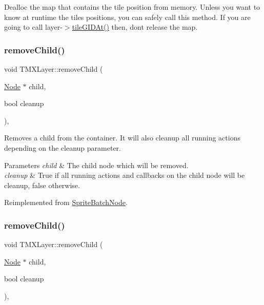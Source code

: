 Dealloc the map that contains the tile position from memory. Unless you want to know at runtime the tiles positions, you can safely call this method. If you are going to call layer-\/$>$\hyperlink{classTMXLayer_a244f8bff6274b630488bf6ebebdeee5a}{tile\+G\+I\+D\+At()} then, don\textquotesingle{}t release the map. \mbox{\label{classTMXLayer_abaf25490e1f7807816c07167a8d4af46}} 
\subsubsection{\texorpdfstring{remove\+Child()}{removeChild()}\hspace{0.1cm}{\footnotesize\ttfamily [1/2]}}
{\footnotesize\ttfamily void T\+M\+X\+Layer\+::remove\+Child (\begin{DoxyParamCaption}\item[{\hyperlink{classNode}{Node} $\ast$}]{child,  }\item[{bool}]{cleanup }\end{DoxyParamCaption})\hspace{0.3cm}{\ttfamily [override]}, {\ttfamily [virtual]}}

Removes a child from the container. It will also cleanup all running actions depending on the cleanup parameter.


\begin{DoxyParams}{Parameters}
{\em child} & The child node which will be removed. \\
\hline
{\em cleanup} & True if all running actions and callbacks on the child node will be cleanup, false otherwise. \\
\hline
\end{DoxyParams}


Reimplemented from \hyperlink{classSpriteBatchNode_a7bebdfd28805ed83d0a78b49f8b52803}{Sprite\+Batch\+Node}.

\mbox{\label{classTMXLayer_abaf25490e1f7807816c07167a8d4af46}} 
\subsubsection{\texorpdfstring{remove\+Child()}{removeChild()}\hspace{0.1cm}{\footnotesize\ttfamily [2/2]}}
{\footnotesize\ttfamily void T\+M\+X\+Layer\+::remove\+Child (\begin{DoxyParamCaption}\item[{\hyperlink{classNode}{Node} $\ast$}]{child,  }\item[{bool}]{cleanup }\end{DoxyParamCaption})\hspace{0.3cm}{\ttfamily [override]}, {\ttfamily [virtual]}}

